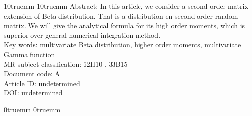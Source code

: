 \documentclass[twoside]{article}%
\begin{document}
\date{}
\author{\abstractsize\sc Zhao Feng$^{1, {\text *}}$,~ %
and~ Huang Shao-Lun$^2$ %
\\
\\  %
}

\maketitle


\let\oldparindent\parindent
\leftskip10truemm
\rightskip10truemm
{
\parindent=0pt
\abstractsizebf Abstract: \rm
\abstractsize
In this article, we consider a second-order matrix extension of Beta distribution.
That is a distribution on second-order random matrix.
We will give the analytical
formula for its high order moments, which is superior over general
numerical integration method.                                                    %
\\
\abstractsizebf Key words:
\abstractsize  multivariate Beta distribution, higher order moments, multivariate Gamma function                   %
\\
 MR subject classification:
\abstractsize 62H10 , 33B15                                     %
\\
\abstractsizebf Document code:
\abstractsize A
\\
\abstractsizebf Article ID:
\abstractsize undetermined
\\
\abstractsizebf DOI:
\abstractsize undetermined
}

\def\parindent{\oldparindent}
\leftskip0truemm
\rightskip0truemm

\end{document}

